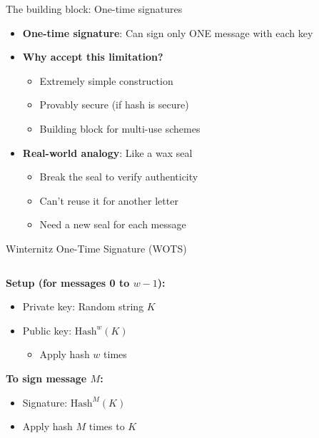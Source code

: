 \documentclass[aspectratio=169, lualatex, handout]{beamer}
\begin{document}
\begin{frame}{The building block: One-time signatures}
	\begin{itemize}
		\item \textbf{One-time signature}: Can sign only ONE message with each key
		\item \textbf{Why accept this limitation?}
		      \begin{itemize}
			      \item Extremely simple construction
			      \item Provably secure (if hash is secure)
			      \item Building block for multi-use schemes
		      \end{itemize}
		\item \textbf{Real-world analogy}: Like a wax seal
		      \begin{itemize}
			      \item Break the seal to verify authenticity
			      \item Can't reuse it for another letter
			      \item Need a new seal for each message
		      \end{itemize}
	\end{itemize}
\end{frame}

\begin{frame}{Winternitz One-Time Signature (WOTS)}
	\begin{columns}[c]
		\begin{column}{1\textwidth}
			\textbf{Setup (for messages 0 to $w-1$):}
			\begin{itemize}
				\item Private key: Random string $K$
				\item Public key: $\text{Hash}^w(K)$
				      \begin{itemize}
					      \item Apply hash $w$ times
				      \end{itemize}
			\end{itemize}

			\textbf{To sign message $M$:}
			\begin{itemize}
				\item Signature: $\text{Hash}^M(K)$
				\item Apply hash $M$ times to $K$
			\end{itemize}
		\end{column}
	\end{columns}
\end{frame}
\end{document}

